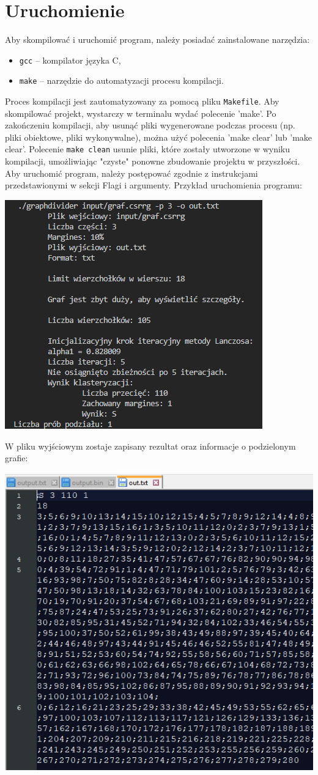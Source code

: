 \documentclass{article}
\begin{document}
    \section{Uruchomienie}

    Aby skompilować i uruchomić program, należy posiadać zainstalowane narzędzia:
    \begin{itemize} \item \texttt{gcc} – kompilator języka C, \item \texttt{make} – narzędzie do automatyzacji procesu kompilacji. \end{itemize}
    Proces kompilacji jest zautomatyzowany za pomocą pliku \texttt{Makefile}. Aby skompilować projekt, wystarczy w terminalu wydać polecenie 'make'.
    Po zakończeniu kompilacji, aby usunąć pliki wygenerowane podczas procesu (np. pliki obiektowe, pliki wykonywalne), można użyć polecenia 'make clear' lub 'make clear'.
    Polecenie \texttt{make clean} usunie pliki, które zostały utworzone w wyniku kompilacji, umożliwiając "czyste" ponowne zbudowanie projektu w przyszłości.
    Aby uruchomić program, należy postępować zgodnie z instrukcjami przedstawionymi w sekcji Flagi i argumenty. Przykład uruchomienia programu:
    \begin{center}
        \includegraphics[width=0.5\linewidth]{img/uruchomienie.png}
    \end{center}
    W pliku wyjściowym zostaje zapisany rezultat oraz informacje o podzielonym grafie:
    \begin{center}
        \includegraphics[width=0.75\linewidth]{img/uruchomienie2.png}
    \end{center}
\end{document}
